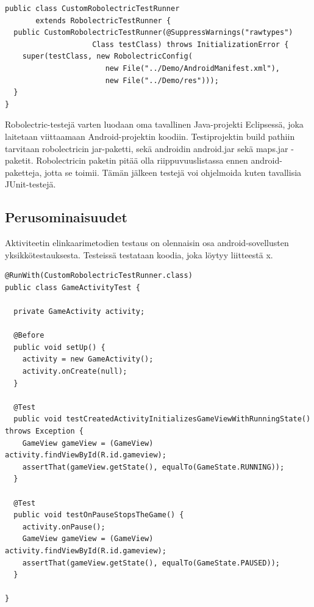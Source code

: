 \begin{lstlisting}[float,label=robolectric_runner,caption=CustomRobolectricTestRunner]
public class CustomRobolectricTestRunner 
       extends RobolectricTestRunner {
  public CustomRobolectricTestRunner(@SuppressWarnings("rawtypes")
                    Class testClass) throws InitializationError {
  	super(testClass, new RobolectricConfig(
                       new File("../Demo/AndroidManifest.xml"), 
                       new File("../Demo/res")));
  }
}
\end{lstlisting}

Robolectric-testejä varten luodaan oma tavallinen Java-projekti Eclipsessä, joka laitetaan viittaamaan Android-projektin koodiin. Testiprojektin build pathiin tarvitaan robolectricin jar-paketti, sekä androidin android.jar sekä maps.jar -paketit. Robolectricin paketin pitää olla riippuvuuslistassa ennen android-paketteja, jotta se toimii. Tämän jälkeen testejä voi ohjelmoida kuten tavallisia JUnit-testejä.

\subsection{Perusominaisuudet}
\label{basic_unittests}

Aktiviteetin elinkaarimetodien testaus on olennaisin osa android-sovellusten yksikkötestauksesta. Testeissä testataan koodia, joka löytyy liitteestä x.

\begin{lstlisting}[float,label=robolectric_activitytest,caption=Robolectric Activity test]
@RunWith(CustomRobolectricTestRunner.class)
public class GameActivityTest {

  private GameActivity activity;

  @Before
  public void setUp() {
    activity = new GameActivity();
    activity.onCreate(null);
  }

  @Test
  public void testCreatedActivityInitializesGameViewWithRunningState() throws Exception {
    GameView gameView = (GameView) activity.findViewById(R.id.gameview);
    assertThat(gameView.getState(), equalTo(GameState.RUNNING));
  }
  
  @Test
  public void testOnPauseStopsTheGame() {
  	activity.onPause();
  	GameView gameView = (GameView) activity.findViewById(R.id.gameview);
  	assertThat(gameView.getState(), equalTo(GameState.PAUSED));
  }
  
}
\end{lstlisting}

